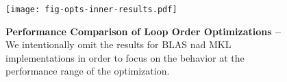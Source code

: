 
\begin{figure}

  \centering
  \texttt{[image: fig-opts-inner-results.pdf]}

  \caption{\textbf{Performance Comparison of Loop Order Optimizations --}
    We intentionally omit the results for BLAS nad MKL implementations in
    order to focus on the behavior at the performance range of the
    optimization.}

  \label{fig-opts-inner-results}

\end{figure}
